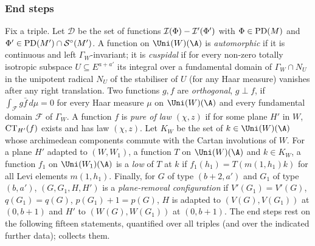 \subsubsection{End steps}\label{sec:pf:thmK:end}\label{sec:pf:thmK:endsteps}
Fix a triple. Let $\mathcal D$ be the set of functions $\mathcal{I}(\Phi)-\mathcal{I}'(\Phi')$ with $\Phi\in\operatorname{PD}(M)$ and
$\Phi'\in\operatorname{PD}(M')\cap\mathcal{S}^{\circ}(M')$. A function on $\Uni(W)(\A)$ is \emph{automorphic} if it is continuous and left
$\Gamma_W$-invariant; it is \emph{cuspidal} if for every non-zero totally isotropic subspace $U\subseteq E^{a+a'}$ its integral
over a fundamental domain of $\Gamma_W\cap N_U$ in the unipotent radical $N_U$ of the stabiliser of $U$ (for any Haar measure)
vanishes after any right translation. Two functions $g,f$ are \emph{orthogonal}, $g\perp f$, if $\int_{\mathcal F}g\bar f\,
d\mu=0$ for every Haar measure $\mu$ on $\Uni(W)(\A)$ and every fundamental domain $\mathcal F$ of $\Gamma_W$. A function $f$
is \emph{pure of law $(\chi,z)$} if for some plane $H'$ in $W$, $\operatorname{CT}_{H'}(f)$ exists and has law $(\chi,z)$. Let $K_W$ be
the set of $k\in\Uni(W)(\A)$ whose archimedean components commute with the Cartan involutions of $W$. For a plane $H'$ adapted
to $(W,W_1)$, a function $T$ on $\Uni(W)(\A)$ and $k\in K_W$, a function $f_1$ on $\Uni(W_1)(\A)$ is a \emph{low} of $T$ at
$k$ if $f_1(h_1)=T(m(1,h_1)k)$ for all Levi elements $m(1,h_1)$. Finally, for $G$ of type $(b+2,a')$ and $G_1$ of type
$(b,a')$, $(G,G_1,H,H')$ is a \emph{plane-removal configuration} if $V'(G_1)=V'(G)$, $q(G_1)=q(G)$, $p(G_1)+1=p(G)$, $H$ is
adapted to $(V(G),V(G_1))$ at $(0,b+1)$ and $H'$ to $(W(G),W(G_1))$ at $(0,b+1)$. The end steps rest on the following fifteen
statements, quantified over all triples (and over the indicated further data); 
collects them.
